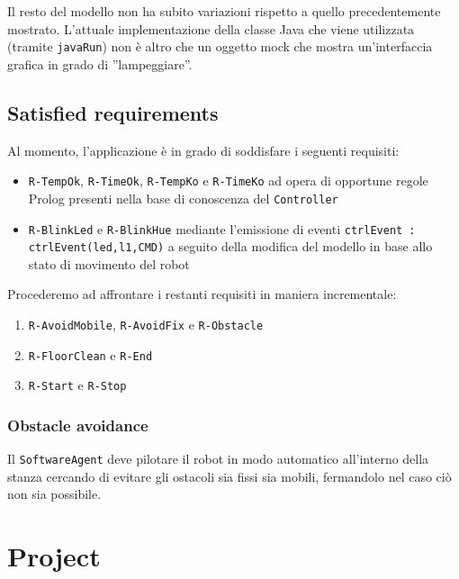 \documentclass{../llncs}
\newcommand{\codescript}[1]{{\mbox{\small{\texttt{#1}}}}\xspace}
\newcommand{\code}[1]{{\color{blue}\small{\texttt{#1}}}}
\newcommand{\labelsec}[1]{\label{sec:#1}}
\begin{document}


Il resto del modello non ha subito variazioni rispetto a quello precedentemente mostrato. L'attuale implementazione della classe Java che viene utilizzata (tramite \codescript{javaRun}) non è altro che un oggetto mock che mostra un'interfaccia grafica in grado di ''lampeggiare''.

\subsection{Satisfied requirements}
Al momento, l'applicazione è in grado di soddisfare i seguenti requisiti:
\begin{itemize}
\item \code{R-TempOk}, \code{R-TimeOk}, \code{R-TempKo} e \code{R-TimeKo} ad opera di opportune regole Prolog presenti nella base di conoscenza del \texttt{Controller}
\item \code{R-BlinkLed} e \code{R-BlinkHue} mediante l'emissione di eventi \codescript{ctrlEvent : ctrlEvent(led,l1,CMD)} a seguito della modifica del modello in base allo stato di movimento del robot
\end{itemize}

Procederemo ad affrontare i restanti requisiti in maniera incrementale:
\begin{enumerate}
\item \code{R-AvoidMobile}, \code{R-AvoidFix} e \code{R-Obstacle}
\item \code{R-FloorClean} e \code{R-End}
\item \code{R-Start} e \code{R-Stop}
\end{enumerate}
 
\subsubsection{Obstacle avoidance}
Il \texttt{SoftwareAgent} deve pilotare il robot in modo automatico all'interno della stanza cercando di evitare gli ostacoli sia fissi sia mobili, fermandolo nel caso ciò non sia possibile.



\section{Project}
\labelsec{Project}
\end{document}
